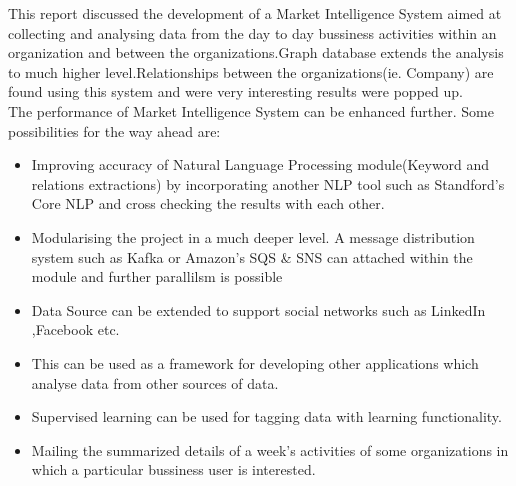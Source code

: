 \par  This report discussed the development of a Market Intelligence System aimed at collecting and analysing data from the day to day bussiness activities within an organization and between the organizations.Graph database extends the analysis to much higher level.Relationships between the organizations(ie. Company) are found using this system and were very interesting results were popped up.
\\ The performance of Market Intelligence System can be enhanced further. Some possibilities for the way ahead are:
\begin{itemize}
	\item Improving accuracy of Natural Language Processing module(Keyword and relations extractions) by incorporating another NLP tool such as Standford’s Core NLP and cross checking the results with each other.
	\item Modularising the project in a much deeper level. A message distribution system such as Kafka or Amazon’s SQS \& SNS can attached within the module and further parallilsm is possible
	\item Data Source can be extended to support social networks such as LinkedIn ,Facebook etc.
	\item This can be used as a framework  for developing other applications which analyse data from other sources of data.
	\item Supervised learning can be used for tagging data with learning functionality.
	\item Mailing the summarized details of a week’s activities of some organizations in which a particular bussiness user is interested. 
\end{itemize}